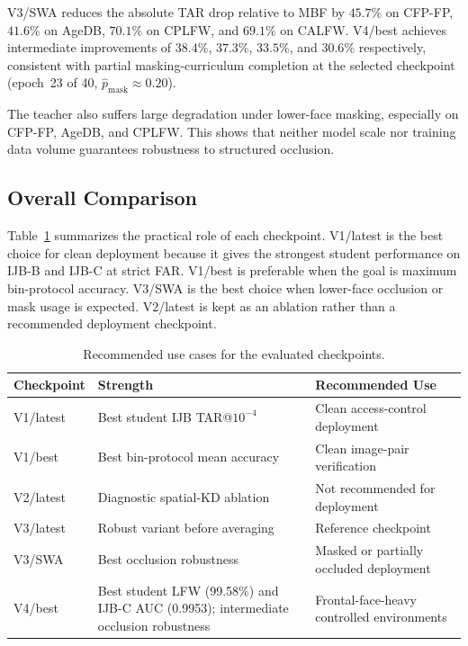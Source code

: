 V3/SWA reduces the absolute TAR drop relative to MBF by $45.7\%$ on CFP-FP, $41.6\%$ on AgeDB, $70.1\%$ on CPLFW, and $69.1\%$ on CALFW. V4/best achieves intermediate improvements of $38.4\%$, $37.3\%$, $33.5\%$, and $30.6\%$ respectively, consistent with partial masking-curriculum completion at the selected checkpoint (epoch~23 of 40, $\hat{p}_{\text{mask}}\approx0.20$).

The teacher also suffers large degradation under lower-face masking, especially on CFP-FP, AgeDB, and CPLFW. This shows that neither model scale nor training data volume guarantees robustness to structured occlusion\cite{cplfw,cfp,agedb,izmailov2019averagingweightsleadswider}.

\subsection{Overall Comparison}

Table~\ref{tab:checkpoint_recommendation} summarizes the practical role of each checkpoint. V1/latest is the best choice for clean deployment because it gives the strongest student performance on IJB-B and IJB-C at strict FAR. V1/best is preferable when the goal is maximum bin-protocol accuracy. V3/SWA is the best choice when lower-face occlusion or mask usage is expected. V2/latest is kept as an ablation rather than a recommended deployment checkpoint.

\begin{table}[h]
\centering
\caption{Recommended use cases for the evaluated checkpoints.}
\label{tab:checkpoint_recommendation}
\begin{tabular}{lll}
\hline
\textbf{Checkpoint} & \textbf{Strength} & \textbf{Recommended Use} \\
\hline
V1/latest & Best student IJB TAR@$10^{-4}$ & Clean access-control deployment \\
V1/best & Best bin-protocol mean accuracy & Clean image-pair verification \\
V2/latest & Diagnostic spatial-KD ablation & Not recommended for deployment \\
V3/latest & Robust variant before averaging & Reference checkpoint \\
V3/SWA & Best occlusion robustness & Masked or partially occluded deployment \\
V4/best & Best student LFW (99.58\%) and IJB-C AUC (0.9953); intermediate occlusion robustness & Frontal-face-heavy controlled environments \\
\hline
\end{tabular}
\end{table}

